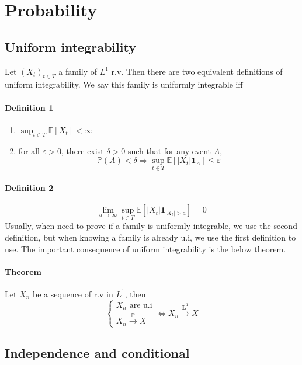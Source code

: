 \documentclass[a4paper,10pt]{article}
\begin{document}
\section{Probability}
\subsection{Uniform integrability}
Let $(X_t)_{t\in T}$ a family of $L^1$ r.v. Then there are two equivalent definitions of uniform integrability. We say this family is uniformly integrable iff
\paragraph{Definition 1}
\begin{enumerate}[i]
 \item $\sup_{t\in T} \mathbb{E}[ X_t ] < \infty$
 \item for all $\varepsilon >0$, there exist $\delta>0$ such that for any event $A$,
 \[   \mathbb{P}(A) <\delta \Longrightarrow \sup_{t\in T} \mathbb{E}[|X_t|\mathbf{1}_{A}] \leq \varepsilon \]
\end{enumerate}
\paragraph{Definition 2}
\[
\lim_{a\rightarrow \infty} \sup_{t\in T} \mathbb{E}[|X_t|\mathbf{1}_{|X_t|>a}] = 0
\]
Usually, when need to prove if a family is uniformly integrable, we use the second definition, but when knowing a family is already u.i, we use the first definition to use. The important consequence of uniform integrability is the below theorem.
\paragraph{Theorem} Let $X_n$ be a sequence of r.v in $L^1$, then
\[
\left\{
\begin{array}{l}
X_n \text{ are u.i}             \\
X_n \xrightarrow{\mathbb{P}} X 
\end{array}
\right.
\Longleftrightarrow
X_n \xrightarrow{\textbf{L}^1} X
\]


\subsection{Independence and conditional}
\end{document}
